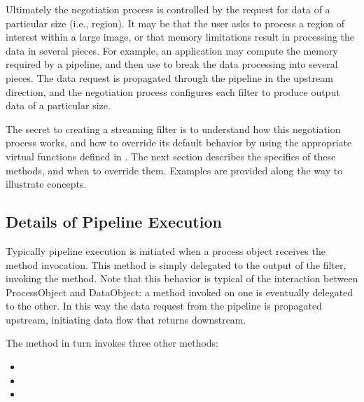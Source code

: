 \begin{figure}
  \par\centering
  \label{fig:DataPipeLineUpdate}
  \par
\end{figure}


Ultimately the negotiation process is controlled by the request for data of a
particular size (i.e., region). It may be that the user asks to process a
region of interest within a large image, or that memory limitations result in
processing the data in several pieces. For example, an application may
compute the memory required by a pipeline, and then use
 to break the data processing into several pieces.
The data request is propagated through the pipeline in the upstream
direction, and the negotiation process configures each filter to produce
output data of a particular size.

The secret to creating a streaming filter is to understand how this
negotiation process works, and how to override its default behavior by using
the appropriate virtual functions defined in . The next
section describes the specifics of these methods, and when to override
them. Examples are provided along the way to illustrate concepts.


\subsection{Details of Pipeline Execution}
\label{sec:DetailsPipelineExecution}

Typically pipeline execution is initiated when a process object
receives the  method invocation. This
method is simply delegated to the output of the filter, invoking the
 method. Note that this behavior is typical
of the interaction between ProcessObject and DataObject: a method
invoked on one is eventually delegated to the other. In this way the
data request from the pipeline is propagated upstream, initiating data
flow that returns downstream.

The  method in turn invokes three other methods:

\begin{itemize}
        \item {}
        \item {}
        \item {}
\end{itemize}

